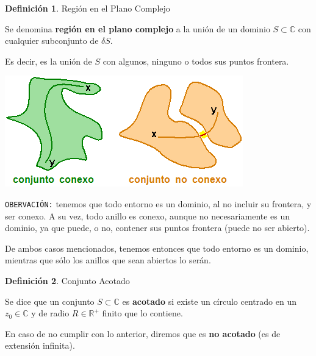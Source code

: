 \documentclass[12pt]{article}
\theoremstyle{definition}
\newtheorem{definition}{Definici\'on}[section]
\begin{document}
\colorbox{green!40!white!80}{\parbox{\linewidth}{
\theoremstyle{definition}
\begin{definition} Regi\'on en el Plano Complejo

Se denomina \textbf{regi\'on en el plano complejo} a la uni\'on de un dominio $S \subset \mathbb{C}$ con cualquier subconjunto de $\delta S$.

Es decir, es la uni\'on de $S$ con algunos, ninguno o todos sus puntos frontera.

\end{definition}}}
\linebreak

\begin{center}
	\includegraphics[scale=0.8]{conexidad.png}
\end{center}

\texttt{OBERVACI\'ON:} tenemos que todo entorno es un dominio, al no incluir su frontera, y ser conexo. A su vez, todo anillo es conexo, aunque no necesariamente es un dominio, ya que puede, o no, contener sus puntos frontera (puede no ser abierto).

De ambos casos mencionados, tenemos entonces que todo entorno es un dominio, mientras que s\'olo los anillos que sean abiertos lo ser\'an. \\

\colorbox{green!40!white!80}{\parbox{\linewidth}{
\theoremstyle{definition}
\begin{definition} Conjunto Acotado

Se dice que un conjunto $S \subset \mathbb{C}$ es \textbf{acotado} si existe un c\'irculo centrado en un $z_0 \in \mathbb{C}$ y de radio $R\in \mathbb{R}^+$ finito que lo contiene.

En caso de no cumplir con lo anterior, diremos que es \textbf{no acotado} (es de extensi\'on infinita).

\end{definition}}}
\linebreak
\linebreak
\end{document}
